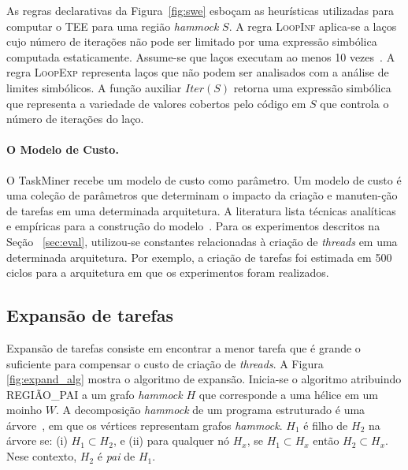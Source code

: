 \documentclass[sigplan,10pt]{acmart}
\newcommand\Taskminer{\mbox{\textsf{TaskMiner}}}
\begin{document}
As regras declarativas da Figura~\ref{fig:swe} esboçam as heurísticas
utilizadas para computar o TEE para uma região {\em hammock} $S$.
A regra \textsc{LoopInf} aplica-se a laços cujo número de iterações não
pode ser limitado por uma expressão simbólica computada estaticamente.
Assume-se que laços executam ao menos 10 vezes~\cite{Wu94}.
A regra \textsc{LoopExp} representa laços que não podem ser analisados 
com a análise de limites simbólicos. A função auxiliar $\mathit{Iter}(S)$ 
retorna uma expressão simbólica que representa a variedade de valores
cobertos pelo código em $S$ que controla o número de iterações do laço.

\paragraph{O Modelo de Custo.}
O {\Taskminer} recebe um modelo de custo como parâmetro.
Um modelo de custo é uma coleção de parâmetros que determinam o impacto
da criação e manuten-\c{c}\~{a}o de tarefas em uma determinada arquitetura.
A literatura lista técnicas analíticas e empíricas
para a construção do modelo~\cite{Poesia17}. 
Para os experimentos descritos na Seção ~\ref{sec:eval}, utilizou-se constantes
relacionadas à criação de {\em threads} em uma determinada arquitetura. Por exemplo,
a criação de tarefas foi estimada em 500 ciclos para a arquitetura em que os experimentos
foram realizados.

\subsection{Expansão de tarefas}
\label{sub:expansion}

Expansão de tarefas consiste em encontrar a menor tarefa que é grande o suficiente
para compensar o custo de criação de {\em threads}. A Figura \ref{fig:expand_alg}
mostra o algoritmo de expansão. Inicia-se o algoritmo atribuindo \textsf{REGIÃO\_PAI} a
um grafo {\em hammock} $H$ que corresponde a uma hélice em um moinho $W$.
A decomposição {\em hammock} de um programa estruturado é uma árvore~\cite{Ferrante87},
em que os vértices representam grafos {\em hammock}.
$H_1$ é filho de $H_2$ na árvore se:
(i) $H_1 \subset H_2$, e (ii) para qualquer 
nó $H_x$, se $H_1 \subset H_x$ então $H_2 \subset H_x$.
Nese contexto, $H_2$ é {\em pai} de $H_1$.
\end{document}
